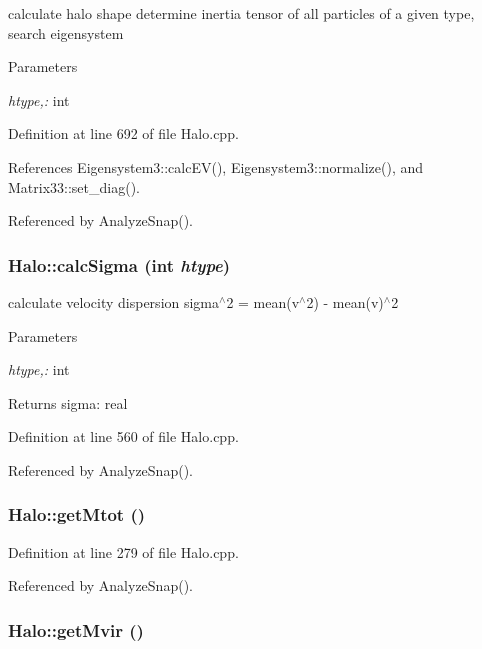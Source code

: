 calculate halo shape determine inertia tensor of all particles of a given type, search eigensystem 


\begin{DoxyParams}{Parameters}
\item[{\em htype,:}]int \end{DoxyParams}


Definition at line 692 of file Halo.cpp.



References Eigensystem3::calcEV(), Eigensystem3::normalize(), and Matrix33::set\_\-diag().



Referenced by AnalyzeSnap().

\subsubsection[{calcSigma}]{ Halo::calcSigma (int {\em htype})}\label{classHalo_a766603cf49235de1ba704f9b894a529d}


calculate velocity dispersion sigma$^\wedge$2 = mean(v$^\wedge$2) -\/ mean(v)$^\wedge$2 


\begin{DoxyParams}{Parameters}
\item[{\em htype,:}]int \end{DoxyParams}
\begin{DoxyReturn}{Returns}
sigma: real 
\end{DoxyReturn}


Definition at line 560 of file Halo.cpp.



Referenced by AnalyzeSnap().

\subsubsection[{getMtot}]{ Halo::getMtot ()}\label{classHalo_aace4451e5de161d6aa8707c5ee394f21}


Definition at line 279 of file Halo.cpp.



Referenced by AnalyzeSnap().

\subsubsection[{getMvir}]{ Halo::getMvir ()}\label{classHalo_a4800137e9fe233e1cdb439e34b4dc723}


